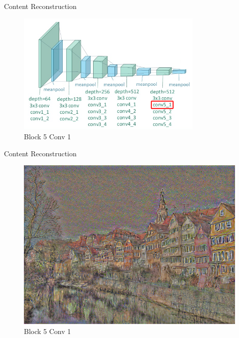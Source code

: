 \documentclass{beamer}
\begin{document}
\begin{frame}{Content Reconstruction}
\begin{figure}[ht]
\centering
\includegraphics[width=0.8\textwidth]{img/vgg19/content/block5_conv1}
\caption*{Block 5 Conv 1}
\end{figure}
\end{frame}
\begin{frame}{Content Reconstruction}
\begin{figure}[ht]
\centering
\includegraphics[width=.8\textwidth]{img/content/block5_conv1}
\caption*{Block 5 Conv 1}
\end{figure}
\end{frame}
\end{document}

